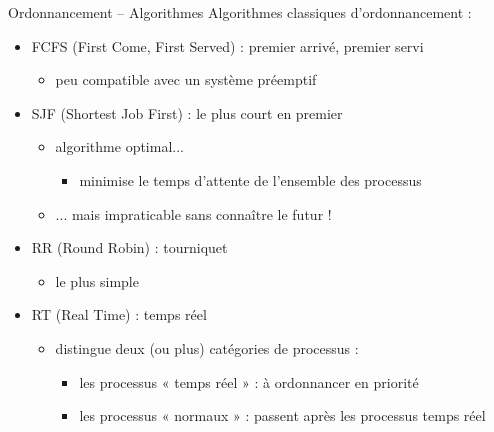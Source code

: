 \begin {frame} {Ordonnancement -- Algorithmes}
    Algorithmes classiques d'ordonnancement :

    \begin {itemize}
	\fB
	\item FCFS (First Come, First Served) : premier arrivé, premier servi

	    \begin {itemize}
		\fC
		\item peu compatible avec un système préemptif
	    \end {itemize}

	\item SJF (Shortest Job First) : le plus court en premier

	    \begin {itemize}
		\fC
		\item algorithme optimal...
		    \begin {itemize}
			\fD
			\item minimise le temps d'attente de l'ensemble
			    des processus
		    \end {itemize}
		\item ... mais impraticable sans connaître le futur !
	    \end {itemize}

	\item RR (Round Robin) : tourniquet

	    \begin {itemize}
		\fC
		\item le plus simple
	    \end {itemize}

	\item RT (Real Time) : temps réel

	    \begin {itemize}
		\fC
		\item distingue deux (ou plus) catégories de processus :
		    \begin {itemize}
			\fD
			\item les processus « temps réel » : à ordonnancer
			    en priorité
			\item les processus « normaux » : passent après
			    les processus temps réel
		    \end {itemize}
	    \end {itemize}

    \end {itemize}
\end {frame}

